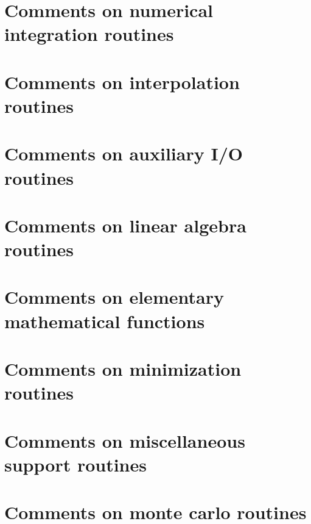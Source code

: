\documentclass{book}
\begin{document}
\chapter{Comments on numerical integration routines}
\label{Comments on numerical integration routines}
\hypertarget{Comments on numerical integration routines}{}

\chapter{Comments on interpolation routines}
\label{Comments on interpolation routines}
\hypertarget{Comments on interpolation routines}{}

\chapter{Comments on auxiliary I/\-O routines}
\label{Comments on auxiliary I/O routines}
\hypertarget{Comments on auxiliary I/O routines}{}

\chapter{Comments on linear algebra routines}
\label{Comments on linear algebra routines}
\hypertarget{Comments on linear algebra routines}{}

\chapter{Comments on elementary mathematical functions}
\label{Comments on elementary mathematical functions}
\hypertarget{Comments on elementary mathematical functions}{}

\chapter{Comments on minimization routines}
\label{Comments on minimization routines}
\hypertarget{Comments on minimization routines}{}

\chapter{Comments on miscellaneous support routines}
\label{Comments on miscellaneous support routines}
\hypertarget{Comments on miscellaneous support routines}{}

\chapter{Comments on monte carlo routines}
\label{Comments on monte carlo routines}
\hypertarget{Comments on monte carlo routines}{}

\end{document}
